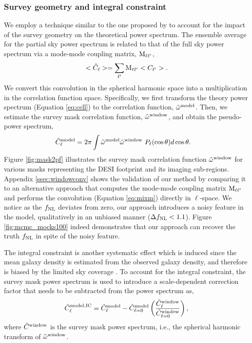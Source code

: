 \subsubsection{Survey geometry and integral constraint}
We employ a technique similar to the one proposed by \cite{chon2004fast} to account for the impact of the survey geometry on the theoretical power spectrum. The ensemble average for the partial sky power spectrum is related to that of the full sky power spectrum via a mode-mode coupling matrix, ${\rm M}_{\ell \ell^{\prime}}$,
\begin{equation}\label{eq:mixm}
    <\tilde{C}_{\ell}> = \sum_{\ell^{\prime}} {\rm M}_{\ell \ell^{\prime}}<C_{\ell^{\prime}}>.
\end{equation}
We convert this convolution in the spherical harmonic space into a multiplication in the correlation function space. Specifically, we first transform the theory power spectrum (Equation \ref{eq:cell}) to the correlation function, $\hat{\omega}^{\rm model}$. Then, we estimate the survey mask correlation function, $\hat{\omega}^{\rm window}$, and obtain the pseudo-power spectrum,
\begin{align}
    \tilde{C}^{\rm model}_{\ell} &= 2\pi \int \hat{\omega}^{\rm model}\hat{\omega}^{\rm window}~P_{\ell}(\cos\theta) d\cos\theta.
\end{align}
Figure \ref{fig:mask2pf} illustrates the survey mask correlation function ${\hat \omega}^{\rm window}$ for various masks representing the DESI footprint and its imaging sub-regions. Appendix \ref{ssec:windowconv} shows the validation of our method by comparing it to an alternative approach that computes the mode-mode coupling matrix ${\rm M}_{\ell \ell^{\prime}}$ and performs the convolution (Equation \ref{eq:mixm}) directly in $\ell$-space. We notice as the $f_{\rm NL}$ deviates from zero, our approach introduces a noisy feature in the model, qualitatively in an unbiased manner ($\Delta f_{\rm NL} < 1.1$). Figure \ref{fig:mcmc_mocks100} indeed demonstrates that our approach can recover the truth $f_{\rm NL}$ in spite of the noisy feature.

The integral constraint is another systematic effect which is induced since the mean galaxy density is estimated from the observed galaxy density, and therefore is biased by the limited sky coverage \citep{peacock1991large}. To account for the integral constraint, the survey mask power spectrum is used to introduce a scale-dependent correction factor that needs to be subtracted from the power spectrum as,
\begin{equation}
     \tilde{C}^{\rm model, IC}_{\ell} = \tilde{C}^{\rm model}_{\ell} - \tilde{C}^{\rm model}_{\ell=0} \left(\frac{\tilde{C}^{\rm window}_{\ell}}{\tilde{C}^{\rm window}_{\ell=0}}\right),
\end{equation}
where $\tilde{C}^{\rm window}$ is the survey mask power spectrum, i.e., the spherical harmonic transform of $\hat{\omega}^{\rm window}$.

